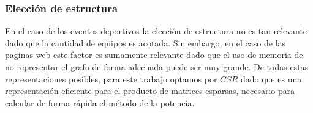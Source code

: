 \subsubsection{Elección de estructura}
En el caso de los eventos deportivos la elección de estructura no es tan relevante dado que la cantidad de equipos es acotada. Sin embargo, en el caso de las paginas web este factor es sumamente relevante dado que el uso de memoria de no representar el grafo de forma adecuada puede ser muy grande. De todas estas representaciones posibles, para este trabajo optamos por $CSR$ dado que es una representación eficiente para el producto de matrices esparsas, necesario para calcular de forma rápida el método de la potencia.